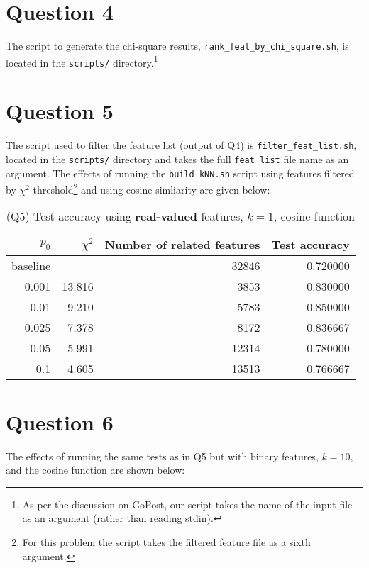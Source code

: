 \documentclass[oneside,justified,marginals=raggedouter]{tufte-handout}
\begin{document}
\section{Question 4}

The script to generate the chi-square results,
\texttt{\small rank\_feat\_by\_chi\_square.sh}, is located in the \texttt{\small scripts/}
directory.\footnote{As per the discussion on GoPost, our script takes
the name of the input file as an argument (rather than reading stdin).}

\section{Question 5}

The script used to filter the feature list (output of Q4) is \texttt{\small filter\_feat\_list.sh}, located in the
\texttt{\small scripts/} directory and takes the full \texttt{\small feat\_list} file name as an argument. The
effects of running the \texttt{\small build\_kNN.sh} script using
features filtered by $\chi^2$ threshold\footnote{For
this problem the script takes the filtered feature file as a sixth
argument.} and using cosine simliarity are given below:


\begin{table}
\begin{tabular}{@{}rrrr@{}}
\toprule
$p_0$ & $\chi^2$ & Number of related features & Test accuracy \\ \midrule
baseline &         & 32846 & 0.720000 \\
0.001    & 13.816  & 3853  & 0.830000 \\
0.01     & 9.210   & 5783  & 0.850000 \\
0.025    & 7.378   & 8172  & 0.836667 \\
0.05     & 5.991   & 12314 & 0.780000 \\
0.1      & 4.605   & 13513 & 0.766667 \\
\bottomrule
\end{tabular}
\caption{(Q5) Test accuracy using {\bf real-valued} features, {\bf $k=1$},
cosine function}
\end{table}


\section{Question 6}

The effects of running the same tests as in Q5 but with binary features,
$k=10$, and the cosine function are shown below:
\end{document}
